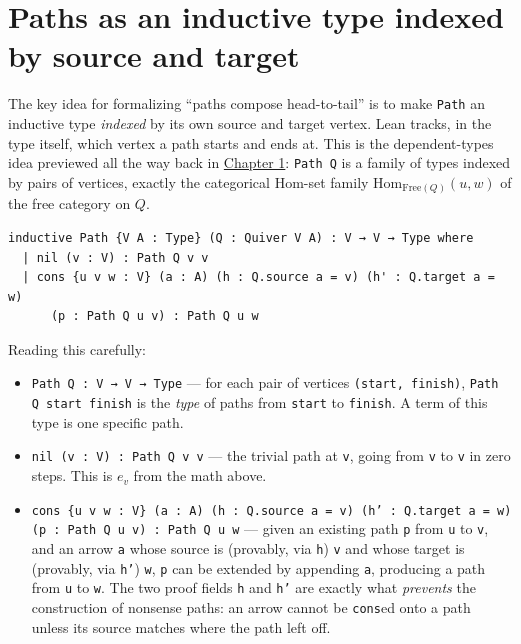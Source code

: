 \section{Paths as an inductive type indexed by source and target}\label{sec:11-path-algebras:04-paths-as-inductive-type:1}

The key idea for formalizing ``paths compose head-to-tail'' is to make \texttt{Path} an inductive type \emph{indexed} by its own source and target vertex. Lean tracks, in the type itself, which vertex a path starts and ends at. This is the dependent-types idea previewed all the way back in \hyperref[sec:01-basics:03-dependent-types:1]{Chapter 1}: \texttt{Path Q} is a family of types indexed by pairs of vertices, exactly the categorical \(\mathrm{Hom}\)-set family \(\mathrm{Hom}_{\mathrm{Free}(Q)}(u,w)\) of the free category on \(Q\).

\begin{lstlisting}
inductive Path {V A : Type} (Q : Quiver V A) : V → V → Type where
  | nil (v : V) : Path Q v v
  | cons {u v w : V} (a : A) (h : Q.source a = v) (h' : Q.target a = w)
      (p : Path Q u v) : Path Q u w
\end{lstlisting}

Reading this carefully:

\begin{itemize}
\tightlist
\item
  \texttt{Path Q : V → V → Type} --- for each pair of vertices \texttt{(start, finish)}, \texttt{Path Q start finish} is the \emph{type} of paths from \texttt{start} to \texttt{finish}. A term of this type is one specific path.
\item
  \texttt{nil (v : V) : Path Q v v} --- the trivial path at \texttt{v}, going from \texttt{v} to \texttt{v} in zero steps. This is \(e_v\) from the math above.
\item
  \texttt{cons \{u v w : V\} (a : A) (h : Q.source a = v) (h' : Q.target a = w) (p : Path Q u v) : Path Q u w} --- given an existing path \texttt{p} from \texttt{u} to \texttt{v}, and an arrow \texttt{a} whose source is (provably, via \texttt{h}) \texttt{v} and whose target is (provably, via \texttt{h'}) \texttt{w}, \texttt{p} can be extended by appending \texttt{a}, producing a path from \texttt{u} to \texttt{w}. The two proof fields \texttt{h} and \texttt{h'} are exactly what \emph{prevents} the construction of nonsense paths: an arrow cannot be \texttt{cons}ed onto a path unless its source matches where the path left off.
\end{itemize}

